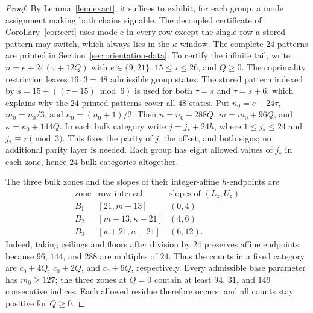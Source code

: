 \begin{proof}
By Lemma~\ref{lem:exact}, it suffices to exhibit, for each group, a mode assignment making both
chains signable. The decoupled certificate of Corollary~\ref{cor:cert} uses mode $\mathrm c$ in every
row except the single row a stored pattern may switch, which always lies in the $\kappa$-window.
The complete $24$ patterns are printed in
Section~\ref{sec:orientation-data}. To certify the infinite tail, write
$n=e+24(\tau+12Q)$ with $e\in\{9,21\}$, $15\le\tau\le26$, and $Q\ge0$.  The coprimality restriction
leaves $16\cdot3=48$ admissible group states. The stored pattern indexed by
$s=15+((\tau-15)\bmod6)$ is used for both $\tau=s$ and $\tau=s+6$, which explains why the
$24$ printed patterns cover all $48$ states. Put $n_0=e+24\tau$, $m_0=n_0/3$, and
$\kappa_0=(n_0+1)/2$. Then $n=n_0+288Q$, $m=m_0+96Q$, and $\kappa=\kappa_0+144Q$.
In each bulk category write $j=j_*+24h$, where $1\le j_*\le24$
and $j_*\equiv r\pmod3$. This fixes the parity of $j$, the offset, and both signs;
no additional parity layer is needed. Each group has eight allowed values of $j_*$ in each
zone, hence $24$ bulk categories altogether.

The three bulk zones and the slopes of their integer-affine $h$-endpoints are
\[
\begin{array}{c|c|c}
\text{zone}&\text{row interval}&\text{slopes of }(L_z,U_z)\\\hline
B_1&[21,m-13]&(0,4)\\
B_2&[m+13,\kappa-21]&(4,6)\\
B_3&[\kappa+21,n-21]&(6,12).
\end{array}
\]
Indeed, taking ceilings and floors after division by $24$ preserves affine endpoints,
because $96$, $144$, and $288$ are multiples of $24$. Thus the counts in a fixed category are
$c_0+4Q$, $c_0+2Q$, and $c_0+6Q$, respectively. Every admissible base parameter has $m_0\ge127$;
the three zones at $Q=0$ contain at least $94$, $31$, and $149$ consecutive indices.
Each allowed residue therefore occurs, and all counts stay positive for $Q\ge0$.


\end{proof}
